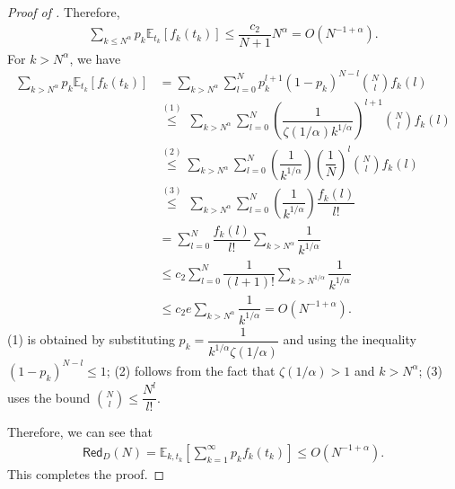 \documentclass[10pt,a4paper]{amsart}
\newcommand{\testdataerror}{\mathsf{Red}_D}
\begin{document}
\begin{proof}[Proof of ]
    Therefore,
    \begin{align*}
        \sum\limits_{k\le N^{\alpha}}p_k\mathbb{E}_{t_k}[f_k(t_k)] \le  \dfrac{c_2}{N+1} N^{\alpha} =O(N^{-1+\alpha}).
    \end{align*}
    For $k>N^{\alpha}$, we have 
    \begin{align*}
        \sum\limits_{k> N^{\alpha}}p_k\mathbb{E}_{t_k}[f_k(t_k)] &= \sum\limits_{k> N^{\alpha}}\sum\limits_{l=0}^N p_k^{l+1} (1-p_k)^{N-l}\binom{N}{l}f_k(l) \\
        &\overset{(1)}{\le}\ \sum\limits_{k> N^{\alpha}}\sum\limits_{l=0}^N \left(\dfrac{1}{\zeta(1/\alpha)k^{1/\alpha}}\right)^{l+1} \binom{N}{l}f_k(l) \\
        &\overset{(2)}{\le} \sum\limits_{k> N^{\alpha}}\sum\limits_{l=0}^N \left(\dfrac{1}{k^{1/\alpha}}\right)\left(\dfrac{1}{N}\right)^l \binom{N}{l}f_k(l) \\
        &\overset{(3)}{\le}\ \sum\limits_{k> N^{\alpha}}\sum\limits_{l=0}^N \left(\dfrac{1}{k^{1/\alpha}}\right)\dfrac{f_k(l)}{l!}  
        \\&= \sum\limits_{l=0}^N \dfrac{f_k(l)}{l!} \sum\limits_{k> N^{\alpha}}\dfrac{1}{k^{1/\alpha}}
        \\ &\le c_2\sum\limits_{l=0}^N \dfrac{1}{(l+1)!} \sum\limits_{k> N^{1/\alpha}}\dfrac{1}{k^{1/\alpha}}
        \\ &\le c_2e\sum\limits_{k> N^{\alpha}}\dfrac{1}{k^{1/\alpha}} 
        = O(N^{-1+\alpha}).
    \end{align*}
    (1) is obtained by substituting $p_k=\dfrac{1}{k^{1/\alpha}\zeta(1/\alpha)}$ and using the inequality $(1 - p_k)^{N-l} \le 1$; (2) follows from the fact that $\zeta(1/\alpha) > 1$ and $k > N^{\alpha}$; (3) uses the bound $\binom{N}{l} \le \dfrac{N^l}{l!}$.

    Therefore, we can see that
    \begin{align*}
   \testdataerror(N)=\mathbb{E}_{k,t_k}
   \left[\sum\limits_{k=1}^{\infty}p_kf_k(t_k) \right]\le O(N^{-1+\alpha}).
    \end{align*}
This completes the proof.   
\end{proof}
\end{document}
